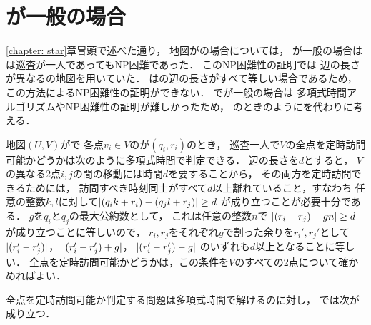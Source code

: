 \section{{\maxIdletime}が一般の場合}
\ref{chapter: star}章冒頭で述べた通り，
地図が{\graphStar}の場合については，
{\maxIdletime}が一般の場合は
{\patProb}は巡査が一人であってもNP困難であった\cite[Theorem~6]{coene2011charlemagne}．
このNP困難性の証明では
辺の長さが異なる{\graphStar}の地図を用いていた．
{\graphUnit}は{\graphStar}の辺の長さがすべて等しい場合であるため，
この方法によるNP困難性の証明ができない．
{\graphUnit}で{\maxIdletime}が一般の場合は
多項式時間アルゴリズムやNP困難性の証明が難しかったため，
{\graphLine}のときのように{\timeSpecifiedPatProb}を代わりに考える．


地図$(U, V)$が{\graphUnit}で
各点$v_i \in V$の{\exactTime}が$(q_i, r_i)$のとき，
巡査一人で$V$の全点を定時訪問可能かどうかは次のように多項式時間で判定できる．
%
辺の長さを$d$とすると，
$V$の異なる2点$i, j$の間の移動には時間$d$を要することから，
その両方を定時訪問できるためには，
訪問すべき時刻同士がすべて$d$以上離れていること，すなわち
任意の整数$k, l$に対して$\lvert{(q_i k + r_i) - (q_j l + r_j)}\rvert \geq d$%
が成り立つことが必要十分である．
$g$を$q_i$と$q_j$の最大公約数として，
これは任意の整数$n$で
$\lvert{(r_i - r_j) + gn}\rvert \geq d$%
が成り立つことに等しいので，
$r_i, r_j$をそれぞれ$g$で割った余りを$r_i', r_j'$として
$\lvert{(r_i' - r_j')}\rvert$，%
$\lvert{(r_i' - r_j') + g}\rvert$，%
$\lvert{(r_i' - r_j') - g}\rvert$
のいずれも$d$以上となることに等しい．
%
全点を定時訪問可能かどうかは，この条件を$V$のすべての2点について確かめればよい．

全点を定時訪問可能か判定する問題は多項式時間で解けるのに対し，
{\timeSpecifiedPatProb}では次が成り立つ．


